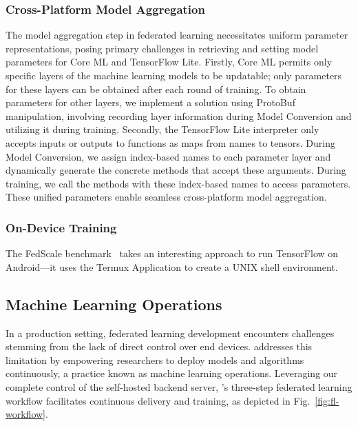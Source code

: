 \subsubsection{Cross-Platform Model Aggregation}
The model aggregation step in federated learning necessitates uniform parameter
representations,
posing primary challenges in retrieving and setting model parameters for Core ML
and TensorFlow Lite. Firstly,
Core ML permits only specific layers of the machine learning models to be
updatable;
only parameters for these layers can be obtained after each round of training.
To obtain parameters for other layers,
we implement a solution using ProtoBuf manipulation,
involving recording layer information during Model Conversion and utilizing it
during training. Secondly,
the TensorFlow Lite interpreter only accepts inputs or outputs to functions as
maps from names to tensors. During Model Conversion,
we assign index-based names to each parameter layer and dynamically generate the
concrete methods that accept these arguments. During training,
we call the methods with these index-based names to access parameters.
These unified parameters enable seamless cross-platform model aggregation.

\subsubsection{On-Device Training}

The FedScale benchmark~\cite{lai2022fedscale} takes an interesting approach to
run TensorFlow on Android---it uses the Termux Application to
create a UNIX shell environment.

\subsection{Machine Learning Operations}
\label{sec:mlops}

\newcommand{\model}{$M$}
\newcommand{\fs}{$S_\mathrm F$}
In a production setting,
federated learning development encounters challenges stemming from the lack of
direct control over end devices.
\fedkit addresses this limitation by empowering researchers to deploy models and
algorithms continuously, a practice known as machine learning operations.
Leveraging our complete control of the self-hosted backend server,
\fedkit's three-step federated learning workflow facilitates continuous delivery
and training, as depicted in Fig.~\ref{fig:fl-workflow}.


